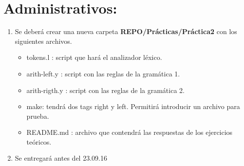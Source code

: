 \documentclass[11pt]{article}
\begin{document}
\section{Administrativos:}
\label{sec:orgheadline3}
\begin{enumerate}
\item Se deberá crear una nueva carpeta \textbf{REPO/Prácticas/Práctica2} con los siguientes
archivos.
\begin{itemize}
\item tokens.l : script que hará el analizador léxico.
\item arith-left.y : script con las reglas de la gramática 1.
\item arith-rigth.y : script con las reglas de la gramática 2.
\item make: tendrá dos tags right y left. Permitirá introducir un archivo para prueba.
\item README.md : archivo que contendrá las respuestas de los ejercicios teóricos.
\end{itemize}
\item Se entregará antes del 23.09.16
\end{enumerate}
\end{document}
